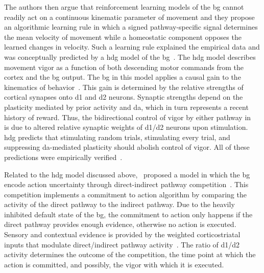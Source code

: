 The authors then argue that reinforcement learning models of the \gls{bg} cannot readily act on a continuous kinematic parameter of movement and they propose an algorithmic learning rule in which a signed pathway-specific signal determines the mean velocity of movement while a homeostatic component opposes the learned changes in velocity.
Such a learning rule explained the empirical data and was conceptually predicted by a \gls{hdg} model of the \gls{bg}~\cite{Yttri2016Nature, Yttri2018MovDisorder}.
The \gls{hdg} model describes movement vigor as a function of both descending motor commands from the cortex and the \gls{bg} output.
The \gls{bg} in this model applies a causal gain to the kinematics of behavior~\cite{Yttri2018MovDisorder}.
This gain is determined by the relative strengths of cortical synapses onto \gls{d1} and \gls{d2} neurons.
Synaptic strengths depend on the plasticity mediated by prior activity and \gls{da}, which in turn represents a recent history of reward.
Thus, the bidirectional control of vigor by either pathway in~\cite{Yttri2016Nature} is due to altered relative synaptic weights of \gls{d1}/\gls{d2} neurons upon stimulation.
\Gls{hdg} predicts that stimulating random trials, stimulating every trial, and suppressing \gls{da}-mediated plasticity should abolish control of vigor.
All of these predictions were empirically verified~\cite{Yttri2016Nature}.
\par
Related to the \gls{hdg} model discussed above,~\citeauthor{Dunovan2016FrontNeurosci} proposed a model in which the \gls{bg} encode action uncertainty through direct-indirect pathway competition~\cite{Dunovan2016FrontNeurosci}.
This competition implements a commitment to action algorithm by comparing the activity of the direct pathway to the indirect pathway.
Due to the heavily inhibited default state of the \gls{bg}, the commitment to action only happens if the direct pathway provides enough evidence, otherwise no action is executed.
Sensory and contextual evidence is provided by the weighted corticostriatal inputs that modulate direct/indirect pathway activity~\cite{Dunovan2016FrontNeurosci}.
The ratio of \gls{d1}/\gls{d2} activity determines the outcome of the competition, the time point at which the action is committed, and possibly, the vigor with which it is executed.






